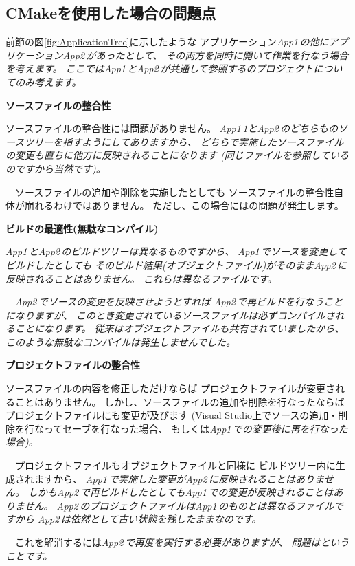 \subsection{CMakeを使用した場合の問題点}
\label{subsec:Problems}

\def\App#1{\it{App#1\,}}
\def\App#1{\it{App#1\,}}

\noindent
前節の図\ref{fig:ApplicationTree}に示したような
アプリケーション\App{1}の他にアプリケーション\App{2}があったとして、
その両方を同時に開いて作業を行なう場合を考えます。
ここでは\App{1}と\App{2}が共通して参照する\SprLib のプロジェクトについてのみ考えます。

\bigskip
\noindent
\bf{ソースファイルの整合性}
\begin{narrow}[20pt]
	ソースファイルの整合性には問題がありません。
	\App1{1}と\App{2}のどちらも\SprLib のソースツリーを指すようにしてありますから、
	どちらで実施したソースファイルの変更も直ちに他方に反映されることになります
	(同じファイルを参照しているのですから当然です)。

	　ソースファイルの追加や削除を実施したとしても
	ソースファイルの整合性自体が崩れるわけではありません。
	ただし、この場合にはの問題が発生します。
\end{narrow}

\medskip
\noindent
\bf{ビルドの最適性(無駄なコンパイル)}
\begin{narrow}[20pt]
	\App{1}と\App{2}のビルドツリーは異なるものですから、
	\App{1}でソースを変更してビルドしたとしても
	そのビルド結果(オブジェクトファイル)がそのまま\App{2}に反映されることはありません。
	これらは異なるファイルです。

	　\App{2}でソースの変更を反映させようとすれば
	\App{2}で再ビルドを行なうことになりますが、
	このとき変更されているソースファイルは必ずコンパイルされることになります。
	従来はオブジェクトファイルも共有されていましたから、
	このような無駄なコンパイルは発生しませんでした。
\end{narrow}

\medskip
\noindent
\bf{プロジェクトファイルの整合性}
\begin{narrow}[20pt]
	ソースファイルの内容を修正しただけならば
	プロジェクトファイルが変更されることはありません。
	しかし、ソースファイルの追加や削除を行なったならば
	プロジェクトファイルにも変更が及びます
	(Visual Studio上でソースの追加・削除を行なってセーブを行なった場合、
	もしくは\App{1}での変更後に再\cmake を行なった場合)。

	　プロジェクトファイルもオブジェクトファイルと同様に
	ビルドツリー内に生成されますから、
	\App{1}で実施した変更が\App{2}に反映されることはありません。
	しかも\App{2}で再ビルドしたとしても\App{1}での変更が反映されることはありません。
	\App{2}のプロジェクトファイルは\App{1}のものとは異なるファイルですから
	\App{2}は依然として古い状態を残したままなのです。

	\indent
	　これを解消するには\App{2}で再度\cmake を実行する必要がありますが、
	問題はということです。
\end{narrow}

